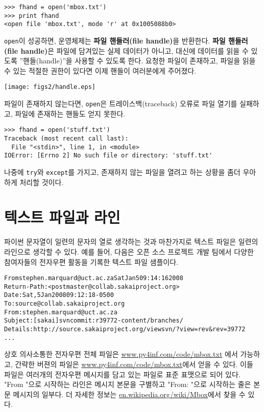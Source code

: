 \beforeverb
\begin{verbatim}
>>> fhand = open('mbox.txt')
>>> print fhand
<open file 'mbox.txt', mode 'r' at 0x1005088b0>
\end{verbatim}
\afterverb
%

{\tt open}이 성공하면, 운영체제는 {\bf 파일 핸들러(file handle)}을 반환한다.
{\bf 파일 핸들러(file handle)}은 파일에 담겨있는 실제 데이터가 아니고, 대신에 데이터를 읽을 수 있도록 ''핸들(handle)''을 사용할 수 있도록 한다.
요청한 파일이 존재하고, 파일을 읽을 수 있는 적절한 권한이 있다면 이제 핸들이 여러분에게 주어졌다.

\beforefig
\centerline{\texttt{[image: figs2/handle.eps]}}
\afterfig
파일이 존재하지 않는다면, {\tt open}은 트레이스백(traceback) 오류로 파일 열기를 실패하고, 파일에 존재하는 핸들도 얻지 못한다.

\beforeverb
\begin{verbatim}
>>> fhand = open('stuff.txt')
Traceback (most recent call last):
  File "<stdin>", line 1, in <module>
IOError: [Errno 2] No such file or directory: 'stuff.txt'
\end{verbatim}
\afterverb
%

나중에 {\tt try}와 {\tt except}를 가지고, 존재하지 않는 파일을 열려고 하는 상황을 좀더 우아하게 처리할 것이다.

\section{텍스트 파일과 라인}
파이썬 문자열이 일련의 문자의 열로 생각하는 것과 마찬가지로 텍스트 파일은 일련의 라인으로 생각할 수 있다.
예를 들어, 다음은 오픈 소스 프로젝트 개발 팀에서 다양한 참여자들의 전자우편 활동을 기록한 텍스트 파일 샘플이다.

\beforeverb
\begin{alltt}
From stephen.marquard@uct.ac.za Sat Jan  5 09:14:16 2008
Return-Path: <postmaster@collab.sakaiproject.org>
Date: Sat, 5 Jan 2008 09:12:18 -0500
To: source@collab.sakaiproject.org
From: stephen.marquard@uct.ac.za
Subject: [sakai] svn commit: r39772 - content/branches/
Details: http://source.sakaiproject.org/viewsvn/?view=rev\&rev=39772
...
\end{alltt}
\afterverb
상호 의사소통한 전자우편 전체 파일은  \url{www.py4inf.com/code/mbox.txt} 에서 가능하고, 간략한 버젼의 파일은 \url{www.py4inf.com/code/mbox.txt}에서 얻을 수 있다.
이들 파일은 여러개의 전자우편 메시지를 담고 있는 파일로 표준 표맷으로 되어 있다.
"From "으로 시작하는 라인은 메시지 본문을 구별하고 "From: "으로 시작하는 줄은 본문 메시지의 일부다.
더 자세한 정보는 \url{en.wikipedia.org/wiki/Mbox}에서 찾을 수 있다.

